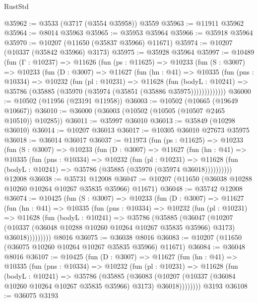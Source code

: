 \begin{lexlean}{RustStd}
\begin{coremodule}
@35962 := @3533 (@3717 (@3554 @35958)) @3559
@35963 := @11911 @35962
@35964 := @8014 @35963
@35965 := @35953 @35964
@35966 := @35918 @35964
@35970 := @10207 (@11650 (@35837 @35966) @11671)
@35974 := @10207 (@10337 (@35842 @35966) @3173)
@35975 := @35928 @35964
@35997 := @10489
    (fun (Γ : @10237) =>
    @11626
      (fun (ps : @11625) =>
      @10233
        (fun (S : @3007) =>
        @10233
          (fun (D : @3007) =>
          @11627
            (fun (hn : @41) =>
            @10335
              (fun (pns : @10334) =>
              @10232
                (fun (pl : @10231) =>
                @11628
                  (fun (bodyL : @10241) =>
                  @35786 (@35885 (@35970 (@35974 (@35851 (@35886 @35975)))))))))))))
@36000 := @10502 (@11956 (@23191 @11958))
@36003 := @10502 (@10665 (@19649 @10667))
@36010 := @36000 (@36003 (@10502 (@10505 (@10507 @2465 @10510)) @10285))
@36011 := @35997 @36010
@36013 := @35849 (@10298 @36010)
@36014 := @10207 @36013
@36017 := @10305 @36010 @27673 @35975
@36018 := @36014 @36017
@36037 := @11973
    (fun (ps : @11625) =>
    @10233
      (fun (S : @3007) =>
      @10233
        (fun (D : @3007) =>
        @11627
          (fun (hn : @41) =>
          @10335
            (fun (pns : @10334) =>
            @10232
              (fun (pl : @10231) =>
              @11628 (fun (bodyL : @10241) => @35786 (@35885 (@35970 (@35974 @36018))))))))))
    @12008
@36038 := @35731 @12008
@36047 := @10207 (@11650 (@36038 @10288 @10260 @10264 @10267 @35835 @35966) @11671)
@36048 := @35742 @12008
@36074 := @10425
    (fun (S : @3007) =>
    @10233
      (fun (D : @3007) =>
      @11627
        (fun (hn : @41) =>
        @10335
          (fun (pns : @10334) =>
          @10232
            (fun (pl : @10231) =>
            @11628
              (fun (bodyL : @10241) =>
              @35786
                (@35885
                  (@36047
                    (@10207
                      (@10337 (@36048 @10288 @10260 @10264 @10267 @35835 @35966) @3173)
                      @36018)))))))))
    @8016
@36075 := @36038 @8016
@36083 := @10207 (@11650 (@36075 @10260 @10264 @10267 @35835 @35966) @11671)
@36084 := @36048 @8016
@36107 := @10425
    (fun (D : @3007) =>
    @11627
      (fun (hn : @41) =>
      @10335
        (fun (pns : @10334) =>
        @10232
          (fun (pl : @10231) =>
          @11628
            (fun (bodyL : @10241) =>
            @35786
              (@35885
                (@36083
                  (@10207 (@10337 (@36084 @10260 @10264 @10267 @35835 @35966) @3173) @36018))))))))
    @3193
@36108 := @36075 @3193

\end{coremodule}
\end{lexlean}

